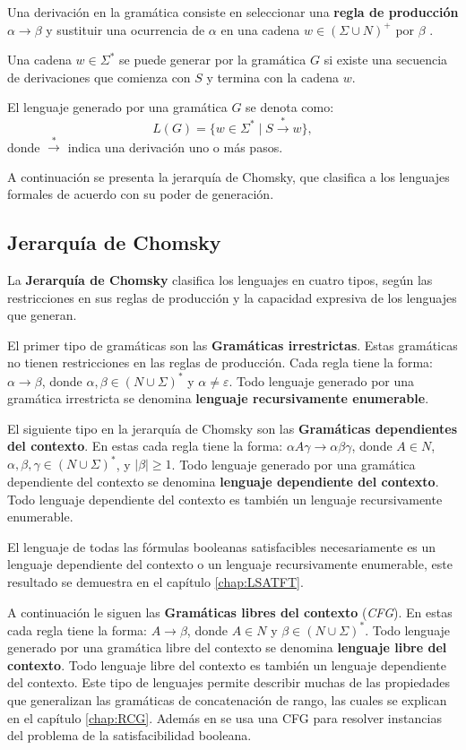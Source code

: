 Una derivación en la gramática consiste en seleccionar una \textbf{regla de producción} $\alpha \to \beta$ y sustituir una ocurrencia de
$\alpha$ en una cadena $w\in (\Sigma \cup N)^+$ por $\beta$ \cite{authomataTheory}.

Una cadena $w\in\Sigma^*$  se puede generar por la gramática $G$ si existe una secuencia de derivaciones que comienza con $S$
y termina con la cadena $w$.

El lenguaje generado por una gramática \(G\) se denota como:
\[
  L(G) = \{ w \in \Sigma^* \mid S \overset{*}{\to} w \},
\]
donde \(\overset{*}{\to}\) indica una derivación uno o más pasos.

A continuación se presenta la jerarquía de Chomsky, que clasifica a los lenguajes formales de acuerdo con su poder de generación.

\subsection{Jerarquía de Chomsky}

La \textbf{Jerarquía de Chomsky} \cite{hunter2020chomsky} clasifica los lenguajes en cuatro tipos, según las restricciones en sus reglas de 
producción y la capacidad expresiva de los lenguajes que generan.

El primer tipo de gramáticas son las \textbf{Gramáticas irrestrictas}. Estas gramáticas no tienen restricciones en las reglas de producción.
Cada regla tiene la forma: \(\alpha \to \beta\), donde \(\alpha, \beta \in (N \cup \Sigma)^*\) y \(\alpha \neq \varepsilon\).
Todo lenguaje generado por una gramática irrestricta se denomina \textbf{lenguaje recursivamente enumerable}. 

El siguiente tipo en la jerarquía de Chomsky son las \textbf{Gramáticas dependientes del contexto}. En estas cada regla tiene la forma: \(\alpha A \gamma \to \alpha \beta \gamma\), donde \(A \in N\), \(\alpha, \beta, \gamma \in (N \cup \Sigma)^*\), y \(|\beta| \geq 1\).
Todo lenguaje generado por una gramática dependiente del contexto se denomina \textbf{lenguaje dependiente del contexto}.
Todo lenguaje dependiente del contexto es también un lenguaje recursivamente enumerable. 

El lenguaje de todas las fórmulas booleanas satisfacibles necesariamente es un lenguaje dependiente del contexto o un lenguaje
recursivamente enumerable, este resultado se demuestra en el capítulo \ref{chap:LSATFT}.

A continuación le siguen las \textbf{Gramáticas libres del contexto} (\textit{CFG}). En estas cada regla tiene la forma: \(A \to \beta\), donde \(A \in N\) y \(\beta \in (N \cup \Sigma)^*\).
Todo lenguaje generado por una gramática libre del contexto se denomina \textbf{lenguaje libre del contexto}.
Todo lenguaje libre del contexto es también un lenguaje dependiente del contexto. Este tipo de lenguajes permite describir 
muchas de las propiedades que generalizan las gramáticas de concatenación de rango, las cuales se explican en el capítulo
\ref{chap:RCG}. Además en \cite{aCFSAT} se usa una CFG para resolver instancias del problema de la satisfacibilidad booleana.

